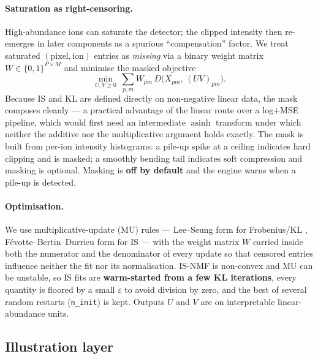 \documentclass[11pt]{article}
\newcommand{\code}[1]{\texttt{#1}}
\begin{document}
\paragraph{Saturation as right-censoring.} High-abundance ions can saturate the detector;
the clipped intensity then re-emerges in later components as a spurious ``compensation''
factor. We treat saturated $(\text{pixel}, \text{ion})$ entries as \emph{missing} via a
binary weight matrix $W \in \{0,1\}^{P\times M}$ and minimise the masked objective
\begin{equation}
  \min_{U, V \ge 0}\ \sum_{p,m} W_{pm}\, D\!\big(X_{pm},\, (UV)_{pm}\big).
\end{equation}
Because IS and KL are defined directly on non-negative linear data, the mask composes
cleanly --- a practical advantage of the linear route over a log$+$MSE pipeline, which would
first need an intermediate $\operatorname{asinh}$ transform under which neither the additive
nor the multiplicative argument holds exactly. The mask is built from per-ion intensity
histograms: a pile-up spike at a ceiling indicates hard clipping and is masked; a smoothly
bending tail indicates soft compression and masking is optional. Masking is \textbf{off by
default} and the engine warns when a pile-up is detected.

\paragraph{Optimisation.} We use multiplicative-update (MU) rules --- Lee--Seung form for
Frobenius/KL \citep{lee2001}, F\'evotte--Bertin--Durrieu form for IS \citep{fevotte2009} ---
with the weight matrix $W$ carried inside both the numerator and the denominator of every
update so that censored entries influence neither the fit nor its normalisation. IS-NMF is
non-convex and MU can be unstable, so IS fits are \textbf{warm-started from a few KL
iterations}, every quantity is floored by a small $\varepsilon$ to avoid division by zero,
and the best of several random restarts (\code{n\_init}) is kept. Outputs $U$ and $V$ are on
interpretable linear-abundance units.

\subsection{Illustration layer}
\label{sec:illustration}
\end{document}
